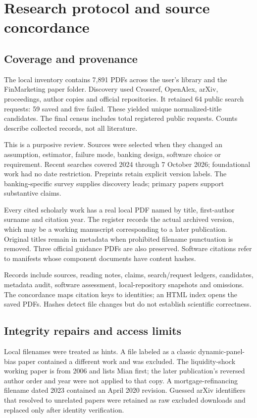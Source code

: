 \chapter{Research protocol and source concordance}\label{app:evidence}
\section{Coverage and provenance}
The local inventory contains 7,891 PDFs across the user's library and the
FinMarketing paper folder. Discovery used Crossref, OpenAlex, arXiv,
proceedings, author copies and official repositories. It retained 64
public search requests: 59 saved and five failed. These yielded \CandidateCount{} unique
normalized-title candidates. The final census includes \PublicRequestCount{} total registered
public requests. Counts describe collected records, not all literature.

This is a purposive review. Sources were selected when they changed an
assumption, estimator, failure mode, banking design, software choice or
requirement. Recent searches covered 2024 through 7 October 2026;
foundational work had no date restriction. Preprints retain explicit
version labels. The banking-specific survey \citep{banksurvey2023}
supplies discovery leads; primary papers support substantive claims.

Every cited scholarly work has a real local PDF named by title,
first-author surname and citation year. The register records the actual
archived version, which may be a working manuscript corresponding to a
later publication. Original titles remain in metadata when prohibited
filename punctuation is removed. Three official guidance PDFs are also
preserved. Software citations refer to manifests whose component
documents have content hashes.

Records include sources, reading notes, claims, search/request ledgers,
candidates, metadata audit, software assessment, local-repository
snapshots and omissions. The concordance maps citation keys to identities;
an HTML index opens the saved PDFs. Hashes detect file changes but do
not establish scientific correctness.

\section{Integrity repairs and access limits}
Local filenames were treated as hints. A file labeled as a classic
dynamic-panel-bias paper contained a different work and was excluded.
The liquidity-shock working paper is from 2006 and lists Mian first;
the later publication's reversed author order and year were not applied
to that copy. A mortgage-refinancing filename dated 2023 contained an
April 2020 revision. Guessed arXiv identifiers that resolved to unrelated
papers were retained as raw excluded downloads and replaced only after
identity verification.

